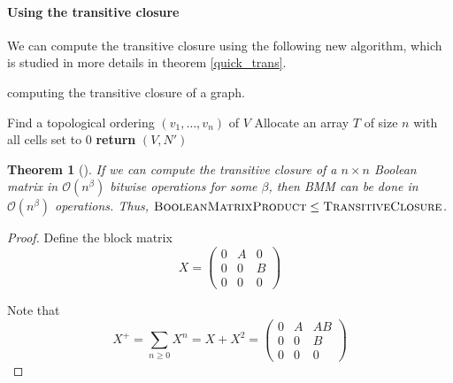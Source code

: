 \documentclass[11pt,a4paper]{article}
\newcommand{\BigO}{\mathcal O}
\newtheorem{Theo}{Theorem}
\theoremstyle{definition}
\begin{document}
\paragraph{Using the transitive closure}
We can compute the transitive closure using the following new algorithm,
which is studied in more details in theorem \ref{quick_trans}.
\begin{algorithm}
  \LinesNumbered
  \SetAlgoVlined
   
  \caption{computing the transitive closure of a graph.}
  \label{transitive_closure_alg_optim}

  Find a topological ordering $(v_1,\dots,v_n)$ of $V$\;
  Allocate an array $T$ of size $n$ with all cells set to $0$\;
  \textbf{return} $(V, N')$\;
\end{algorithm}



\begin{Theo}[\cite{fischer1971boolean}]
\label{product_trans}
If we can compute the transitive closure of a $n\times n$ Boolean matrix
in $\BigO(n^\beta)$ bitwise operations for some $\beta$, then 
BMM can be done in $\BigO(n^\beta)$
operations. Thus,
$\textsc{BooleanMatrixProduct} \leq \textsc{TransitiveClosure}$.
\end{Theo}

\begin{proof}
Define the block matrix
\[X = \begin{pmatrix}
0 & A & 0 \\
0 & 0 & B \\
0 & 0 & 0
\end{pmatrix}\]

Note that
\[ X^+ = \sum_{n\geq 0} X^n = X + X^2 =
\begin{pmatrix}
  0 & A & AB \\
  0 & 0 & B \\
  0 & 0 & 0
\end{pmatrix}
\]
\end{proof}
\end{document}
